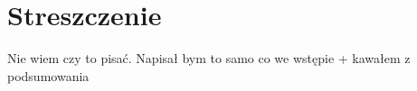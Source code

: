 \chapter{Streszczenie}
%

Nie wiem czy to pisać. Napisał bym to samo co we wstępie + kawałem z podsumowania




%
